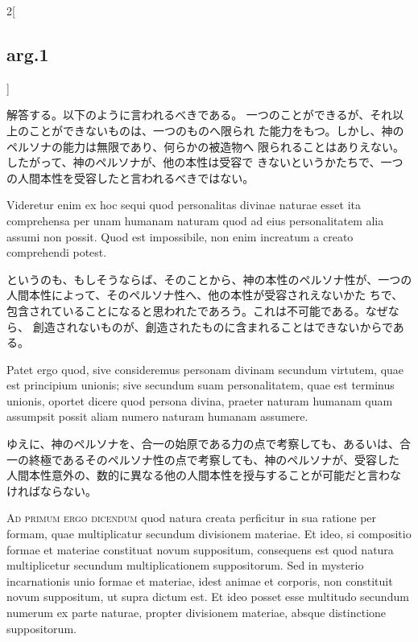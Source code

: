 \documentclass[paper=a4paper,fontsize=10pt,jafontsize=9pt,titlepage]{jlreq}
\begin{document}
\begin{paracol}{2}[\subsection{arg.1}]
\switchcolumn

解答する。以下のように言われるべきである。
一つのことができるが、それ以上のことができないものは、一つのものへ限られ
 た能力をもつ。しかし、神のペルソナの能力は無限であり、何らかの被造物へ
 限られることはありえない。したがって、神のペルソナが、他の本性は受容で
 きないというかたちで、一つの人間本性を受容したと言われるべきではない。

\switchcolumn*

Videretur enim ex hoc sequi quod personalitas
divinae naturae esset ita comprehensa per unam humanam naturam quod ad
eius personalitatem alia assumi non possit. Quod est impossibile, non
enim increatum a creato comprehendi potest.

\switchcolumn

というのも、もしそうならば、そのことから、神の本性のペルソナ性が、一つの
 人間本性によって、そのペルソナ性へ、他の本性が受容されえないかた
 ちで、包含されていることになると思われたであろう。これは不可能である。なぜなら、
 創造されないものが、創造されたものに含まれることはできないからである。

\switchcolumn*

Patet ergo quod, sive
consideremus personam divinam secundum virtutem, quae est principium
unionis; sive secundum suam personalitatem, quae est terminus unionis,
oportet dicere quod persona divina, praeter naturam humanam quam
assumpsit possit aliam numero naturam humanam assumere.

\switchcolumn

ゆえに、神のペルソナを、合一の始原である力の点で考察しても、あるいは、合
 一の終極であるそのペルソナ性の点で考察しても、神のペルソナが、受容した
 人間本性意外の、数的に異なる他の人間本性を授与することが可能だと言わな
 ければならない。

\switchcolumn*[\subsection{ad.1}]

{\scshape Ad primum ergo dicendum} quod natura creata perficitur in sua ratione per
formam, quae multiplicatur secundum divisionem materiae. Et ideo, si
compositio formae et materiae constituat novum suppositum, consequens
est quod natura multiplicetur secundum multiplicationem
suppositorum. Sed in mysterio incarnationis unio formae et materiae,
idest animae et corporis, non constituit novum suppositum, ut supra
dictum est. Et ideo posset esse multitudo secundum numerum ex parte
naturae, propter divisionem materiae, absque distinctione suppositorum.


\end{paracol}
\end{document}
